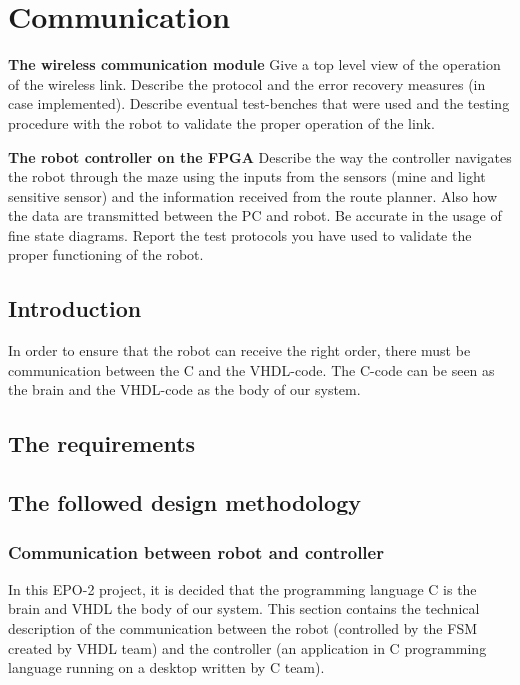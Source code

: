 \chapter{Communication}
\label{chapter_communication}

\textbf{The wireless communication module} 
 Give a top level view of the operation of the wireless link. Describe the protocol and the error recovery measures (in case implemented). Describe eventual test-benches that were used and the testing procedure with the robot to validate the proper operation of the link.


\textbf{The robot controller on the FPGA}
Describe the way the controller navigates the robot through the maze using the inputs from the sensors (mine and light sensitive sensor) and the information received from the route planner. Also how the data are transmitted between the PC and robot. Be accurate in the usage of fine state diagrams. Report the test protocols you have used to validate the proper functioning of the robot.

\section{Introduction}

In order to ensure that the robot can receive the right order, there must be communication between the C and the VHDL-code. The C-code can be seen as the brain and the VHDL-code as the body of our system.


\section{The requirements}

\section{The followed design methodology}

\subsection{Communication between robot and controller}
In this EPO-2 project, it is decided that the programming language C is the brain and VHDL the body of our system. This section contains the technical description of the communication between the robot (controlled by the FSM created by VHDL team) and the controller (an application in C programming language running on a desktop written by C team).

